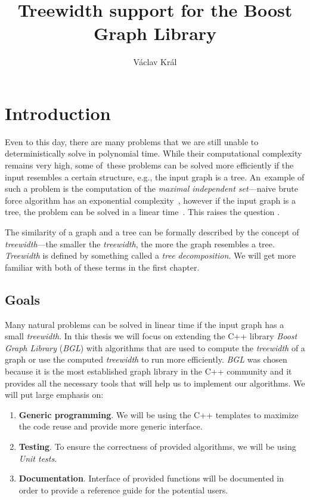 \documentclass[thesis=B,english]{FITthesis}[2019/03/21]
\title{Treewidth support for the Boost Graph Library}
\author{Václav Král} %
\begin{document}


\chapter{Introduction}
Even to this day, there are many problems that we are still unable to deterministically solve in polynomial time. While their computational complexity remains very high, some of~these problems can be solved more efficiently if the input resembles a certain structure, e.g., the input graph is a tree. An~example of such a problem is the computation of the \emph{maximal independent set}---naive brute force algorithm has an exponential complexity~\cite{mis_exp}, however if the input graph is a tree, the problem can be solved in a linear time~\cite{mis_linear}. This raises the question .

The similarity of a graph and a tree can be formally described by the concept of \emph{treewidth}---the smaller the \emph{treewidth}, the more the graph resembles a tree. \emph{Treewidth} is defined by something called a \emph{tree decomposition}. We will get more familiar with both of these terms in the first chapter.

\section{Goals}
Many natural problems can be solved in linear time if the input graph has a small \emph{treewidth}. In this thesis we will focus on extending the C++ library \emph{Boost Graph Library} (\emph{BGL}) with algorithms that are used to compute the \emph{treewidth} of a graph or use the computed \emph{treewidth} to run more efficiently. \emph{BGL} was chosen because it is the most established graph library in the C++ community and it provides all the necessary tools that will help us to implement our algorithms. We will put large emphasis on:

\begin{enumerate}
	\item \textbf{Generic programming}. We will be using the C++ templates to maximize the code reuse and provide more generic interface.
	\item \textbf{Testing}. To ensure the correctness of provided algorithms, we will be using \emph{Unit tests}. 
	\item \textbf{Documentation}. Interface of provided functions will be documented in order to provide a reference guide for the potential users.
\end{enumerate}
\end{document}
